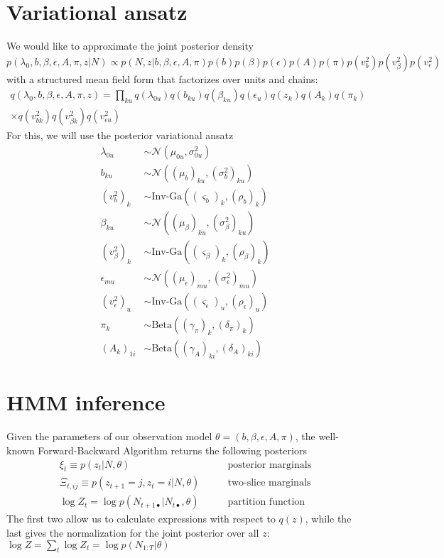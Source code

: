 \documentclass[11pt]{article}
\begin{document}
\section{Variational ansatz}
We would like to approximate the joint posterior density 
\begin{equation}
    p(\lambda_0, b, \beta, \epsilon, A, \pi, z|N) \propto p(N, z|b, \beta, \epsilon, A, \pi) p(b) p(\beta) p(\epsilon) p(A) p(\pi) p(v^2_b) p(v^2_\beta) p(v^2_\epsilon)
\end{equation}
with a structured mean field form that factorizes over units and chains:
\begin{multline}
    q(\lambda_0, b, \beta, \epsilon, A, \pi, z) = \prod_{ku} q(\lambda_{0u}) 
    q(b_{ku}) q(\beta_{ku}) q(\epsilon_u) q(z_k) q(A_k) q(\pi_k) \\
    \times q(v^2_{bk}) q(v^2_{\beta k}) q(v^2_{\epsilon u})
\end{multline}
For this, we will use the posterior variational ansatz
\begin{align}
    \lambda_{0u} &\sim \mathcal{N}\left(\mu_{0u}, \sigma^2_{0u}\right) \\
    b_{ku} &\sim \mathcal{N}\left((\mu_b)_{ku}, (\sigma^2_b)_{ku}\right) \\
    (v^2_b)_{k} &\sim \text{Inv-Ga}\left((\varsigma_b)_{k}, (\rho_b)_{k} \right) \\
    \beta_{ku} &\sim \mathcal{N}\left((\mu_\beta)_{ku}, (\sigma^2_\beta)_{ku}\right) \\
    (v^2_\beta)_{k} &\sim \text{Inv-Ga}\left((\varsigma_\beta)_k, (\rho_\beta)_k \right) \\
    \epsilon_{mu} &\sim \mathcal{N}((\mu_\epsilon)_{mu}, (\sigma^2_\epsilon)_{mu}) \\
    (v^2_\epsilon)_{u} &\sim \text{Inv-Ga}\left((\varsigma_\epsilon)_u, (\rho_\epsilon)_u \right) \\
    \pi_k &\sim \mathrm{Beta}\left((\gamma_\pi)_k, (\delta_\pi)_k \right) \\ 
    \left(A_k \right)_{1i} &\sim \mathrm{Beta}\left((\gamma_A)_{ki}, (\delta_A)_{ki} \right)  
\end{align}

\section{HMM inference}
Given the parameters of our observation model $\theta = (b, \beta, \epsilon, A, \pi)$, the well-known Forward-Backward Algorithm returns the following posteriors
\begin{align}
    \xi_t \equiv p(z_t|N, \theta) &\qquad \text{posterior marginals} \\
    \Xi_{t, ij} \equiv p(z_{t+1} = j, z_t = i|N, \theta) &\qquad \text{two-slice marginals} \\
    \log Z_t = \log p(N_{t+1 \bullet}|N_{t\bullet}, \theta) &\qquad \text{partition function}
\end{align}
The first two allow us to calculate expressions with respect to $q(z)$, while the last gives the normalization for the joint posterior over all $z$: $\log Z = \sum_t \log Z_t = \log p(N_{1:T}|\theta)$
\end{document}
